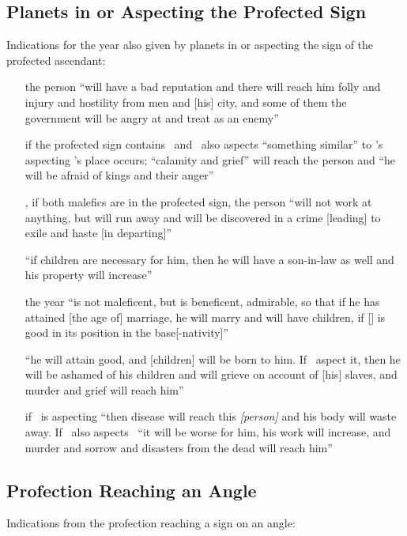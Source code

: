 \subsection{Planets in or Aspecting the Profected Sign}
Indications for the year also given by planets in or aspecting the sign of the profected ascendant:
\begin{itemize}[topsep=0em,itemsep=0em]
\item[\Saturn]  the person ``will have a bad reputation and there will reach him folly and injury and hostility from men and [his] city, and some of them the government will be angry at and treat as an enemy'' 

\item[\Mars]  if the profected sign contains \Mars\, and \Saturn\, also aspects ``something similar'' to \Mars's aspecting \Saturn's place occurs; ``calamity and grief'' will reach the person and ``he will be afraid of kings and their anger''

\item[\Saturn,\Mars]  if both malefics are in the profected sign, the person ``will not work at anything, but will run away and will be discovered in a crime [leading] to exile and haste [in departing]''

\item[\Jupiter]  ``if children are necessary for him, then he will have a son-in-law as well and his property will increase''

\item[\Venus]  the year ``is not maleficent, but is beneficent, admirable, so that if he has attained [the age of] marriage, he will marry and will have children, if [\Venus] is good in its position in the base[-nativity]''

\item[\Mercury]  ``he will attain good, and [children] will be born to him. If \Saturn\, aspect it, then he will be ashamed of his children and will grieve on account of [his] slaves, and murder and grief will reach him''

\item[\Moon]  if \Saturn\, is aspecting ``then disease will reach this \textsl{[person]} and his body will waste away. If \Mercury\, also aspects \Saturn\, ``it will be worse for him, his work will increase, and murder and sorrow and disasters from the dead will reach him''
\end{itemize}

\subsection{Profection Reaching an Angle}
Indications from the profection reaching a sign on an angle:

